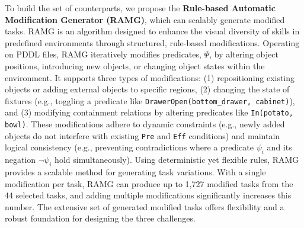 
To build the set of counterparts, we propose the \textbf{Rule-based Automatic Modification Generator (RAMG)}, which can scalably generate modified tasks. RAMG is an algorithm designed to enhance the visual diversity of skills in predefined environments through structured, rule-based modifications. Operating on PDDL files, RAMG iteratively modifies predicates, $\Psi$, by altering object positions, introducing new objects, or changing object states within the environment. It supports three types of modifications: (1) repositioning existing objects or adding external objects to specific regions, (2) changing the state of fixtures (e.g., toggling a predicate like \texttt{DrawerOpen(bottom\_drawer, cabinet)}), and (3) modifying containment relations by altering predicates like \texttt{In(potato, bowl)}. These modifications adhere to dynamic constraints (e.g., newly added objects do not interfere with existing \texttt{Pre} and \texttt{Eff} conditions) and maintain logical consistency (e.g., preventing contradictions where a predicate $\psi_i$ and its negation $\neg\psi_i$ hold simultaneously). Using deterministic yet flexible rules, RAMG provides a scalable method for generating task variations. With a single modification per task, RAMG can produce up to 1,727 modified tasks from the 44 selected tasks, and adding multiple modifications significantly increases this number. The extensive set of generated modified tasks offers flexibility and a robust foundation for designing the three challenges.

